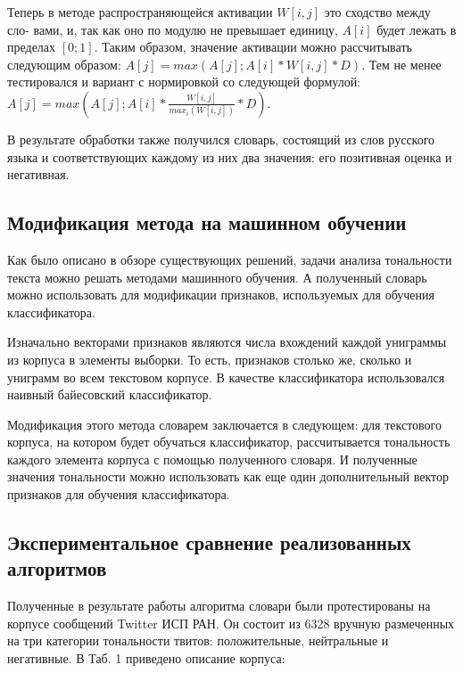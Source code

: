 Теперь в методе распространяющейся активации $W[i, j]$ это сходство между сло-
вами, и, так как оно по модулю не превышает единицу, $A[i]$ будет лежать в пределах
$[0;1]$. Таким образом, значение активации можно рассчитывать следующим образом:
$A[j] = max(A[j]; A[i] * W[i, j] * D)$. Тем не менее тестировался и вариант с нормировкой
со следующей формулой: $A[j] = max(A[j]; A[i] * \frac{W[i,j]}{max_i(W[i,j])} * D)$.

В результате обработки также получился словарь, состоящий из слов русского
языка и соответствующих каждому из них два значения: его позитивная оценка и
негативная.

\subsection{Модификация метода на машинном обучении}
Как было описано в обзоре существующих решений, задачи анализа тональности
текста можно решать методами машинного обучения. А полученный словарь можно
использовать для модификации признаков, используемых для обучения
классификатора.

Изначально векторами признаков являются числа вхождений каждой униграммы из
корпуса в элементы выборки. То есть, признаков столько же, сколько и униграмм во
всем текстовом корпусе. В качестве классификатора использовался наивный
байесовский классификатор.

Модификация этого метода словарем заключается в следующем: для текстового
корпуса, на котором будет обучаться классификатор, рассчитывается тональность
каждого элемента корпуса с помощью полученного словаря. И полученные значения
тональности можно использовать как еще один дополнительный вектор признаков
для обучения классификатора.

\subsection{Экспериментальное сравнение реализованных алгоритмов}
Полученные в результате работы алгоритма словари были протестированы на
корпусе сообщений Twitter ИСП РАН. Он состоит из 6328 вручную размеченных на
три категории тональности твитов: положительные, нейтральные и негативные. В
Таб. 1 приведено описание корпуса:


\FloatBarrier

